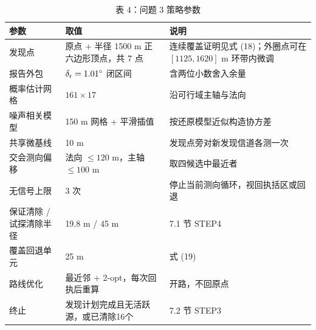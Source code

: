 \begin{table}[htbp]
\centering
\caption{表 4：问题 3 策略参数}

\small
\begin{tabularx}{\linewidth}{@{}p{25mm}p{45mm}X@{}}
\toprule
参数 & 取值 & 说明 \\
\midrule
发现点 & 原点 + 半径 1500 m 正六边形顶点，共 7 点 & 连续覆盖证明见式 (18)；外圈点可在 $[1125,1620]$ m 环带内微调 \\
报告外包 & $\delta_{\rm r}=1.01^\circ$ 闭区间 & 含两位小数舍入余量 \\
概率估计网格 & $161\times17$ & 沿可行域主轴与法向 \\
噪声相关模型 & 150 m 网格 + 平滑插值 & 按还原模型近似构造协方差 \\
共享微基线 & 10 m & 发现点旁对新发现信道各测一次 \\
交会测向偏移 & 法向 $\le120$ m，主轴 $\le100$ m & 取四候选中最近者 \\
无信号上限 & 3 次 & 停止当前测向循环，视回执括区或回退 \\
保证清除 / 试探清除半径 & 19.8 m / 45 m & 7.1 节 STEP4 \\
覆盖回退单元 & 25 m & 式 (19) \\
路线优化 & 最近邻 + 2-opt，每次回执后重算 & 开路，不回原点 \\
终止 & 发现计划完成且无活跃源，或已清除16个 & 7.2 节 STEP3 \\
\bottomrule
\end{tabularx}

\end{table}
